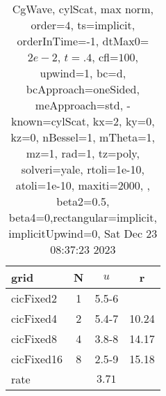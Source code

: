 \begin{table}[H]\tableFont %
\begin{center}
\begin{tabular}{|l|c|c|c|} \hline 
grid  & N &  $ u $ & r \\ \hline 
 cicFixed2 &     1 & \num{5.5}{-6} &        \\ \hline
 cicFixed4 &     2 & \num{5.4}{-7} & 10.24  \\ \hline
 cicFixed8 &     4 & \num{3.8}{-8} & 14.17  \\ \hline
cicFixed16 &     8 & \num{2.5}{-9} & 15.18  \\ \hline
    rate             &       &  $3.71$       &       \\ \hline
\end{tabular}
\caption{CgWave, cylScat, max norm, order=$4$, ts=implicit, orderInTime=-1, dtMax0=$2e-2$, $t=.4$, cfl=$100$, upwind=1, bc=d, bcApproach=oneSided, meApproach=std, -known=cylScat, kx=2, ky=0, kz=0, nBessel=1, mTheta=1, mz=1, rad=1, tz=poly, solveri=yale, rtoli=1e-10, atoli=1e-10, maxiti=2000, , beta2=0.5, beta4=0,rectangular=implicit, implicitUpwind=0, Sat Dec 23 08:37:23 2023}\label{table:cylScatOrder4max}
\end{center}
\end{table}
